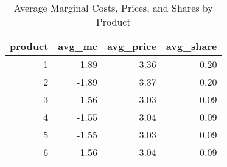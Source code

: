 \begin{table}[ht]
\centering
\begin{tabular}{rrrr}
  \hline
product & avg\_mc & avg\_price & avg\_share \\ 
  \hline
  1 & -1.89 & 3.36 & 0.20 \\ 
    2 & -1.89 & 3.37 & 0.20 \\ 
    3 & -1.56 & 3.03 & 0.09 \\ 
    4 & -1.55 & 3.04 & 0.09 \\ 
    5 & -1.55 & 3.03 & 0.09 \\ 
    6 & -1.56 & 3.04 & 0.09 \\ 
   \hline
\end{tabular}
\caption{Average Marginal Costs, Prices, and Shares by Product} 
\label{tab:mc}
\end{table}
